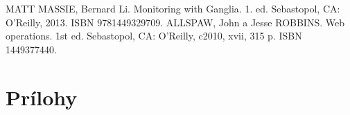 \documentclass[a4paper, upjsfrontpage, thesismargins, thesislinespacing]{rnthesis}
\begin{document}


\renewcommand{\bibname}{Zoznam použitej literatúry}
\begin{thebibliography}{42}
	 MATT MASSIE, Bernard Li. Monitoring with Ganglia. 1. ed. Sebastopol, CA: O'Reilly, 2013. ISBN 9781449329709.
	 ALLSPAW, John a Jesse ROBBINS. Web operations. 1st ed. Sebastopol, CA: O'Reilly, c2010, xvii, 315 p. ISBN 1449377440.
\end{thebibliography}
%
\newpage


\chapter*{Prílohy}
\end{document}
